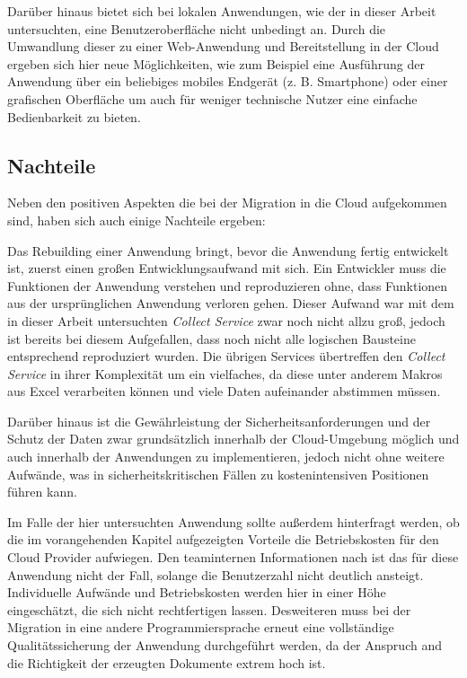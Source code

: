 Darüber hinaus bietet sich bei lokalen Anwendungen, wie der in dieser Arbeit untersuchten, eine Benutzeroberfläche nicht unbedingt an. Durch die Umwandlung dieser zu einer Web-Anwendung und Bereitstellung in der Cloud ergeben sich hier neue Möglichkeiten, wie zum Beispiel eine Ausführung der Anwendung über ein beliebiges mobiles Endgerät (z. B. Smartphone) oder einer grafischen Oberfläche um auch für weniger technische Nutzer eine einfache Bedienbarkeit zu bieten. \pagebreak

\subsection{Nachteile}
Neben den positiven Aspekten die bei der Migration in die Cloud aufgekommen sind, haben sich auch einige Nachteile ergeben:

Das Rebuilding einer Anwendung bringt, bevor die Anwendung fertig entwickelt ist, zuerst einen großen Entwicklungsaufwand mit sich. Ein Entwickler muss die Funktionen der Anwendung verstehen und reproduzieren ohne, dass Funktionen aus der ursprünglichen Anwendung verloren gehen. Dieser Aufwand war mit dem in dieser Arbeit untersuchten \textit{Collect Service} zwar noch nicht allzu groß, jedoch ist bereits bei diesem Aufgefallen, dass noch nicht alle logischen Bausteine entsprechend reproduziert wurden. Die übrigen Services übertreffen den \textit{Collect Service} in ihrer Komplexität um ein vielfaches, da diese unter anderem Makros aus Excel verarbeiten können und viele Daten aufeinander abstimmen müssen.

Darüber hinaus ist die Gewährleistung der Sicherheitsanforderungen und der Schutz der Daten zwar grundsätzlich innerhalb der Cloud-Umgebung möglich und auch innerhalb der Anwendungen zu implementieren, jedoch nicht ohne weitere Aufwände, was in sicherheitskritischen Fällen zu kostenintensiven Positionen führen kann. 

Im Falle der hier untersuchten Anwendung sollte außerdem hinterfragt werden, ob die im vorangehenden Kapitel aufgezeigten Vorteile die Betriebskosten für den Cloud Provider aufwiegen. Den teaminternen Informationen nach ist das für diese Anwendung nicht der Fall, solange die Benutzerzahl nicht deutlich ansteigt. Individuelle Aufwände und Betriebskosten werden hier in einer Höhe eingeschätzt, die sich nicht rechtfertigen lassen. Desweiteren muss bei der Migration in eine andere Programmiersprache erneut eine vollständige Qualitätssicherung der Anwendung durchgeführt werden, da der Anspruch and die Richtigkeit der erzeugten Dokumente extrem hoch ist.
\pagebreak